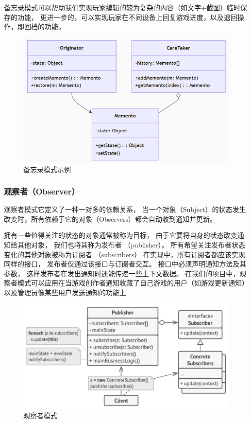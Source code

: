 \documentclass[12pt]{ctexart} %
\begin{document}
备忘录模式可以帮助我们实现玩家编辑的较为复杂的内容（如文字+截图）临时保存的功能，
更进一步的，可以实现玩家在不同设备上回复游戏进度，以及退回操作，即回档的功能。
\begin{figure}[H]
  \centering
  \includegraphics[width=1\textwidth]{beiwang.png}
  \caption{备忘录模式示例}
\end{figure}

\subsubsection{观察者（Observer）}
观察者模式它定义了一种一对多的依赖关系，
当一个对象（Subject）的状态发生改变时，所有依赖于它的对象（Observers）都会自动收到通知并更新。

拥有一些值得关注的状态的对象通常被称为目标， 由于它要将自身的状态改变通知给其他对象， 
我们也将其称为发布者 （publisher）。 所有希望关注发布者状态变化的其他对象被称为订阅者 （subscribers）
在实现中，所有订阅者都应该实现同样的接口， 发布者仅通过该接口与订阅者交互。 
接口中必须声明通知方法及其参数， 这样发布者在发出通知时还能传递一些上下文数据。
在我们的项⽬中，观察者模式可以应⽤在当游戏创作者通知收藏了自己游戏的用户（如游戏更新通知）
以及管理员像某些用户发送通知的功能上

\begin{figure}[H]
  \centering
  \includegraphics[width=1\textwidth]{guancha.png}
  \caption{观察者模式}
\end{figure}
\end{document}
